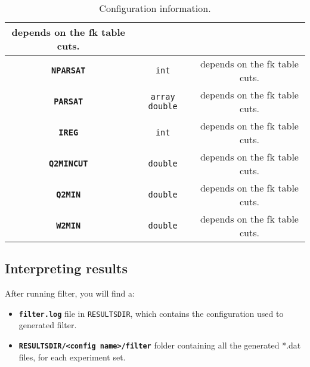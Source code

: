 \begin{table}[H]
\begin{centering}
\begin{tabular}{|c|c|c|}
\begin{minipage}[t]{0.5\columnwidth}
depends on the fk table cuts.%
\end{minipage}\tabularnewline
\hline
\texttt{\textbf{NPARSAT}} & \texttt{int} & %
\begin{minipage}[t]{0.5\columnwidth}%
depends on the fk table cuts.%
\end{minipage}\tabularnewline
\hline
\texttt{\textbf{PARSAT}} & \texttt{array double} & %
\begin{minipage}[t]{0.5\columnwidth}%
depends on the fk table cuts.%
\end{minipage}\tabularnewline
\hline
\texttt{\textbf{IREG}} & \texttt{int} & %
\begin{minipage}[t]{0.5\columnwidth}%
depends on the fk table cuts.%
\end{minipage}\tabularnewline
\hline
\texttt{\textbf{Q2MINCUT}} & \texttt{double} & %
\begin{minipage}[t]{0.5\columnwidth}%
depends on the fk table cuts.%
\end{minipage}\tabularnewline
\hline
\texttt{\textbf{Q2MIN}} & \texttt{double} & %
\begin{minipage}[t]{0.5\columnwidth}%
depends on the fk table cuts.%
\end{minipage}\tabularnewline
\hline
\texttt{\textbf{W2MIN}} & \texttt{double} & %
\begin{minipage}[t]{0.5\columnwidth}%
depends on the fk table cuts.%
\end{minipage}\tabularnewline
\hline
\end{tabular}
\par\end{centering}

\caption{\label{tab:Configuration-information.}Configuration information.}
\end{table}

\subsection{Interpreting results}

After running filter, you will find a: 
\begin{itemize}
\item \texttt{\textbf{filter.log}} file in \texttt{RESULTSDIR}, which contains
the configuration used to generated filter. 
\item \texttt{\textbf{RESULTSDIR/<config name>/filter}} folder containing all the generated
{*}.dat files, for each experiment set. \end{itemize}

